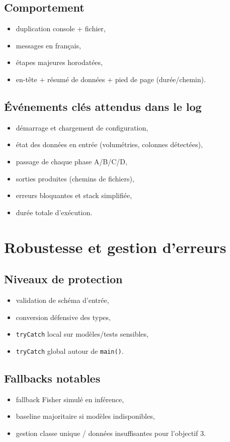 \documentclass[11pt,a4paper]{article}
\begin{document}
\subsection{Comportement}
\begin{itemize}[leftmargin=1.2cm]
  \item duplication console + fichier,
  \item messages en français,
  \item \'etapes majeures horodat\'ees,
  \item en-tête + r\'esum\'e de donn\'ees + pied de page (dur\'ee/chemin).
\end{itemize}

\subsection{Év\'enements cl\'es attendus dans le log}
\begin{itemize}[leftmargin=1.2cm]
  \item d\'emarrage et chargement de configuration,
  \item \'etat des donn\'ees en entr\'ee (volum\'etries, colonnes d\'etect\'ees),
  \item passage de chaque phase A/B/C/D,
  \item sorties produites (chemins de fichiers),
  \item erreurs bloquantes et stack simplifi\'ee,
  \item dur\'ee totale d'ex\'ecution.
\end{itemize}

\section{Robustesse et gestion d'erreurs}
\subsection{Niveaux de protection}
\begin{itemize}[leftmargin=1.2cm]
  \item validation de sch\'ema d'entr\'ee,
  \item conversion d\'efensive des types,
  \item \texttt{tryCatch} local sur modèles/tests sensibles,
  \item \texttt{tryCatch} global autour de \texttt{main()}.
\end{itemize}

\subsection{Fallbacks notables}
\begin{itemize}[leftmargin=1.2cm]
  \item fallback Fisher simul\'e en inf\'erence,
  \item baseline majoritaire si modèles indisponibles,
  \item gestion classe unique / donn\'ees insuffisantes pour l'objectif 3.
\end{itemize}
\end{document}
